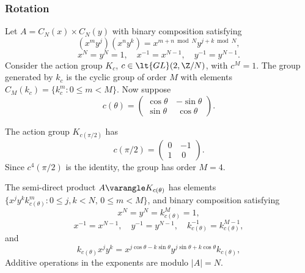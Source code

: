 \subsubsection{Rotation}
Let $A = C_N(x) \times C_N(y)$ with binary composition satisfying
\[
(x^my^j)(x^ny^k) = x^{m+n \bmod N}y^{j+k \bmod N},
\]
\[
x^N = y^N = 1, \quad x^{-1} = x^{N-1}, \quad y^{-1}= y^{N-1}.
\]
Consider the action group $K_c$, $c\in \lt{GL}(2,\Z/N)$,
with $c^M=1$.
The group generated by $k_c$ is the cyclic group of order
$M$ with elements $C_M(k_c) = \{k_c^m : 0 \leq m < M\}$.
Now suppose
\[
c(\theta) = \begin{pmatrix} \cos \theta \, &  -\sin \theta \\ 
                    \sin \theta \, & \, \cos \theta \end{pmatrix}.
\]
\begin{example}[Rotation by $\pi/2$]
The action group $K_{c(\pi/2)}$ has
\[
c(\pi/2) = \begin{pmatrix} 0\, & -1\\ 
                            1\, & \, 0 \end{pmatrix}.
\]
Since $c^4(\pi/2)$ is the identity, the group
has order $M=4$.
\end{example}

The semi-direct product $A\varangle K_{c(\theta)}$ has elements
$\{x^j y^k k_{c(\theta)}^m : 0 \leq j,k < N,\, 0 \leq m < M\}$,
and binary composition satisfying
\[
x^N = y^N = k_{c(\theta)}^M = 1,
\]
\[
x^{-1} = x^{N-1}, \quad y^{-1}= y^{N-1}, \quad k_{c(\theta)}^{-1} = k_{c(\theta)}^{M-1},
\]
and
\[
k_{c(\theta)} x^j y^k = x^{j \cos \theta - k \sin \theta} y^{j \sin
  \theta + k \cos \theta} k_{c(\theta)},
\]
Additive operations in the exponents are modulo $|A|=N$.

